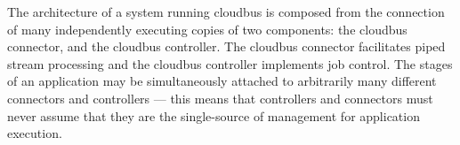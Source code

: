 The architecture of a system running cloudbus is composed from the connection of many independently executing copies of two components: %
the cloudbus connector, and the cloudbus controller. The cloudbus connector facilitates piped stream processing and the cloudbus %
controller implements job control. The stages of an application may be simultaneously attached to arbitrarily many different connectors %
and controllers --- this means that controllers and connectors must never assume that they are the single-source of management for %
application execution.